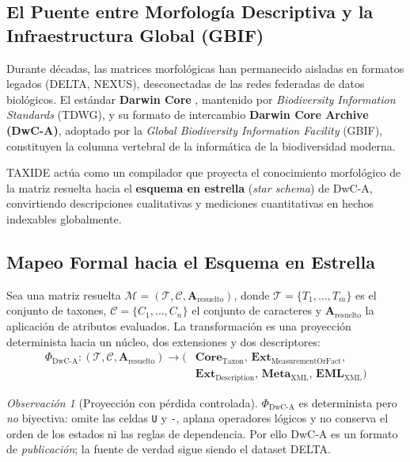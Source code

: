 \documentclass[11pt,a4paper]{article}
\theoremstyle{definition}
\theoremstyle{remark}
\newtheorem*{observacion}{Observación}
\begin{document}
\subsection{El Puente entre Morfología Descriptiva y la Infraestructura Global (GBIF)}
Durante décadas, las matrices morfológicas han permanecido aisladas en formatos legados (DELTA, NEXUS), desconectadas de las redes federadas de datos biológicos. El estándar \textbf{Darwin Core} \cite{wieczorek2012}, mantenido por \textit{Biodiversity Information Standards} (TDWG), y su formato de intercambio \textbf{Darwin Core Archive (DwC-A)}, adoptado por la \textit{Global Biodiversity Information Facility} (GBIF), constituyen la columna vertebral de la informática de la biodiversidad moderna.

TAXIDE actúa como un compilador que proyecta el conocimiento morfológico de la matriz resuelta hacia el \textbf{esquema en estrella} (\textit{star schema}) de DwC-A, convirtiendo descripciones cualitativas y mediciones cuantitativas en hechos indexables globalmente.

\subsection{Mapeo Formal hacia el Esquema en Estrella}
Sea una matriz resuelta $\mathcal{M} = (\mathcal{T}, \mathcal{C}, \mathbf{A}_{\text{resuelto}})$, donde $\mathcal{T} = \{T_1, \dots, T_m\}$ es el conjunto de taxones, $\mathcal{C} = \{C_1, \dots, C_n\}$ el conjunto de caracteres y $\mathbf{A}_{\text{resuelto}}$ la aplicación de atributos evaluados. La transformación es una proyección determinista hacia un núcleo, dos extensiones y dos descriptores:
\begin{align}
\Phi_{\text{DwC-A}} \colon (\mathcal{T}, \mathcal{C}, \mathbf{A}_{\text{resuelto}}) \longrightarrow \Big( & \mathbf{Core}_{\text{Taxon}}, \, \mathbf{Ext}_{\text{MeasurementOrFact}}, \nonumber \\
& \mathbf{Ext}_{\text{Description}}, \, \mathbf{Meta}_{\text{XML}}, \, \mathbf{EML}_{\text{XML}} \Big)
\end{align}

\begin{observacion}[Proyección con pérdida controlada]
$\Phi_{\text{DwC-A}}$ es determinista pero \emph{no} biyectiva: omite las celdas \texttt{U} y \texttt{-}, aplana operadores lógicos y no conserva el orden de los estados ni las reglas de dependencia. Por ello DwC-A es un formato de \emph{publicación}; la fuente de verdad sigue siendo el dataset DELTA.
\end{observacion}
\end{document}

